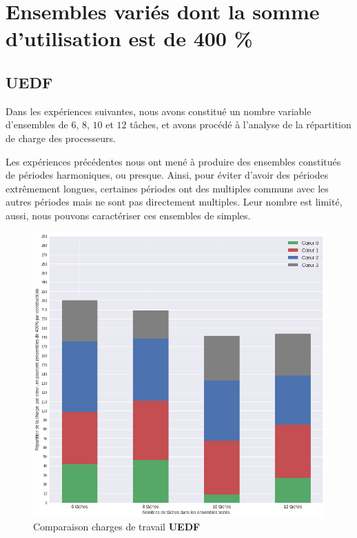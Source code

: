 	
\section{Ensembles variés dont la somme d'utilisation est de 400 \%}

	\subsection{UEDF}
	Dans les expériences suivantes, nous avons constitué un nombre variable d'ensembles de $6$, $8$, $10$ et $12$ tâches, 
	et avons procédé à l'analyse de la répartition de charge des processeurs.\newline
	
	Les expériences précédentes nous ont mené à produire des ensembles constitués de 
	périodes harmoniques, ou \og{}presque\fg{}. Ainsi, pour éviter d'avoir des 
	périodes extrêmement longues, certaines périodes ont des multiples communs 
	avec les autres périodes mais ne sont pas directement multiples. Leur nombre est limité, aussi, nous pouvons 
	caractériser ces ensembles de \og{}simples\fg{}.\newline

	\begin{figure}[H]
		\label{loadevolution}
		\caption{Comparaison charges de travail \textbf{UEDF}}
		\includegraphics[scale=0.5]{img/wcet/repartitiondecharges_uedf}
	\end{figure}		
	

